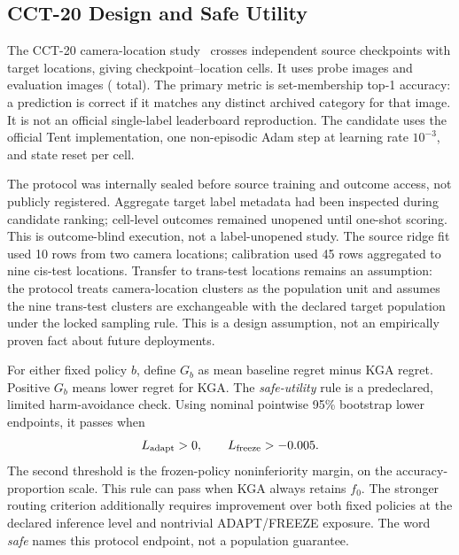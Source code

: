 \subsection{CCT-20 Design and Safe Utility}
\label{sec:cct20-design}

The CCT-20 camera-location study~\cite{beery2018recognition} crosses
\CCTCheckpointCount{} independent source checkpoints with \CCTLocationCount{} target locations,
giving \CCTCellCount{} checkpoint--location cells. It uses
\CCTProbeImageCount{} probe images and \CCTEvaluationImageCount{} evaluation images
(\CCTTargetImageCount{} total). The primary metric is set-membership top-1 accuracy: a prediction
is correct if it matches any distinct archived category for that image.
It is not an official single-label leaderboard reproduction. The candidate uses the official Tent
implementation, one non-episodic Adam step at learning rate $10^{-3}$, and state reset per cell.

The protocol was internally sealed before source training and outcome access, not publicly
registered. Aggregate target label metadata had been inspected during candidate ranking; cell-level
outcomes remained unopened until one-shot scoring. This is outcome-blind execution, not a
label-unopened study. The source ridge fit used 10 rows from two camera locations; calibration used
45 rows aggregated to nine cis-test locations. Transfer to trans-test locations remains an assumption:
the protocol treats camera-location clusters as the population unit and assumes the nine trans-test
clusters are exchangeable with the declared target population under the locked sampling rule. This
is a design assumption, not an empirically proven fact about future deployments.

For either fixed policy $b$, define $G_b$ as mean baseline regret minus KGA regret.
Positive $G_b$ means lower regret for KGA. The \emph{safe-utility} rule is a predeclared,
limited harm-avoidance check. Using nominal pointwise 95\% bootstrap lower endpoints, it passes when
\begin{equation}
 L_{\mathrm{adapt}}>0,\qquad
 L_{\mathrm{freeze}}>-0.005.
 \label{eq:cct-safe-utility}
\end{equation}
The second threshold is the frozen-policy noninferiority margin, on the accuracy-proportion scale.
This rule can pass when KGA always retains $f_0$. The stronger routing criterion additionally
requires improvement over both fixed policies at the declared inference level and nontrivial
ADAPT/FREEZE exposure. The word \emph{safe} names this protocol endpoint, not a population guarantee.


